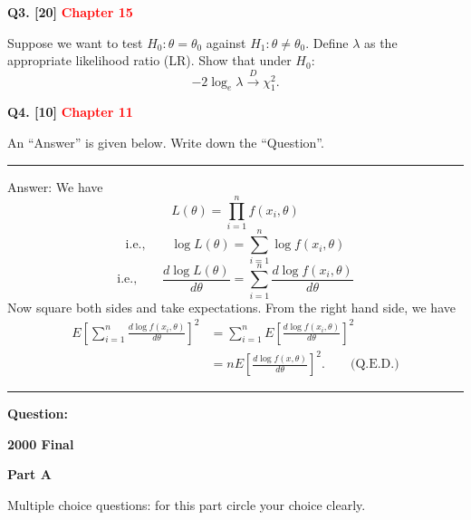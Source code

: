 \documentclass[11pt]{article}
\begin{document}
\bigskip

\textbf{Q3. [20]} \textbf{\textcolor{red}{Chapter 15}}

Suppose we want to test $H_0:\theta=\theta_0$ against $H_1:\theta\neq\theta_0$. Define $\lambda$ as the appropriate likelihood ratio (LR). Show that under $H_0$:
\[
-2\log_e\lambda\xrightarrow{D}\chi_1^2.
\]

\clearpage

\textbf{Q4. [10]}  \textbf{\textcolor{red}{Chapter 11}}

An ``Answer'' is given below. Write down the ``Question''.

\medskip
\hrule
\medskip

Answer: We have
\[
L(\theta)=\prod_{i=1}^n f(x_i,\theta)
\]
\[
\text{i.e.,}\qquad \log L(\theta)=\sum_{i=1}^n\log f(x_i,\theta)
\]
\[
\text{i.e.,}\qquad \frac{d\log L(\theta)}{d\theta}
=\sum_{i=1}^n\frac{d\log f(x_i,\theta)}{d\theta}
\]
Now square both sides and take expectations. From the right hand side, we have
\[
\begin{aligned}
E\!\left[\sum_{i=1}^n\frac{d\log f(x_i,\theta)}{d\theta}\right]^2
&=\sum_{i=1}^n E\!\left[\frac{d\log f(x_i,\theta)}{d\theta}\right]^2\\[4pt]
&=nE\!\left[\frac{d\log f(x,\theta)}{d\theta}\right]^2.
\qquad\text{(Q.E.D.)}
\end{aligned}
\]

\medskip
\hrule
\medskip

\textbf{Question:}



\clearpage

\begin{center}
    {\Large\bfseries 2000 Final}
\end{center}

\vspace{1em}

\begin{center}
\textbf{Part A}
\end{center}

\begingroup
\small
\setlength{\parskip}{0.1em}
Multiple choice questions: for this part circle your choice clearly.
\end{document}
